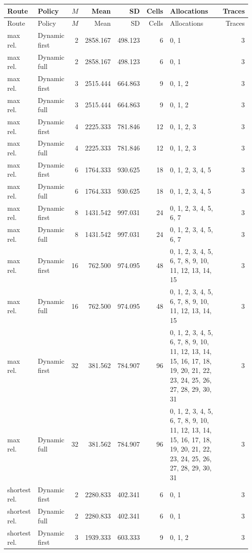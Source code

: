 \documentclass[10pt,a4paper]{article}
\begin{document}
\tiny\setlength{\tabcolsep}{2pt}\begin{longtable}{@{}p{23mm}p{29mm}rrrrp{36mm}r@{}}
\toprule Route & Policy & $M$ & Mean & SD & Cells & Allocations & Traces \\ \midrule\endfirsthead
\toprule Route & Policy & $M$ & Mean & SD & Cells & Allocations & Traces \\ \midrule\endhead
\bottomrule\endfoot
max rel. & Dynamic first & 2 & 2858.167 & 498.123 & 6 & 0, 1 & 3 \\
max rel. & Dynamic full & 2 & 2858.167 & 498.123 & 6 & 0, 1 & 3 \\
max rel. & Dynamic first & 3 & 2515.444 & 664.863 & 9 & 0, 1, 2 & 3 \\
max rel. & Dynamic full & 3 & 2515.444 & 664.863 & 9 & 0, 1, 2 & 3 \\
max rel. & Dynamic first & 4 & 2225.333 & 781.846 & 12 & 0, 1, 2, 3 & 3 \\
max rel. & Dynamic full & 4 & 2225.333 & 781.846 & 12 & 0, 1, 2, 3 & 3 \\
max rel. & Dynamic first & 6 & 1764.333 & 930.625 & 18 & 0, 1, 2, 3, 4, 5 & 3 \\
max rel. & Dynamic full & 6 & 1764.333 & 930.625 & 18 & 0, 1, 2, 3, 4, 5 & 3 \\
max rel. & Dynamic first & 8 & 1431.542 & 997.031 & 24 & 0, 1, 2, 3, 4, 5, 6, 7 & 3 \\
max rel. & Dynamic full & 8 & 1431.542 & 997.031 & 24 & 0, 1, 2, 3, 4, 5, 6, 7 & 3 \\
max rel. & Dynamic first & 16 & 762.500 & 974.095 & 48 & 0, 1, 2, 3, 4, 5, 6, 7, 8, 9, 10, 11, 12, 13, 14, 15 & 3 \\
max rel. & Dynamic full & 16 & 762.500 & 974.095 & 48 & 0, 1, 2, 3, 4, 5, 6, 7, 8, 9, 10, 11, 12, 13, 14, 15 & 3 \\
max rel. & Dynamic first & 32 & 381.562 & 784.907 & 96 & 0, 1, 2, 3, 4, 5, 6, 7, 8, 9, 10, 11, 12, 13, 14, 15, 16, 17, 18, 19, 20, 21, 22, 23, 24, 25, 26, 27, 28, 29, 30, 31 & 3 \\
max rel. & Dynamic full & 32 & 381.562 & 784.907 & 96 & 0, 1, 2, 3, 4, 5, 6, 7, 8, 9, 10, 11, 12, 13, 14, 15, 16, 17, 18, 19, 20, 21, 22, 23, 24, 25, 26, 27, 28, 29, 30, 31 & 3 \\
shortest rel. & Dynamic first & 2 & 2280.833 & 402.341 & 6 & 0, 1 & 3 \\
shortest rel. & Dynamic full & 2 & 2280.833 & 402.341 & 6 & 0, 1 & 3 \\
shortest rel. & Dynamic first & 3 & 1939.333 & 603.333 & 9 & 0, 1, 2 & 3 \\

\end{longtable}
\end{document}
